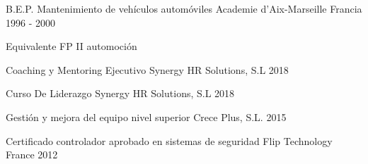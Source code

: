 
    \begin{cventries}

      \cventry
        {B.E.P. Mantenimiento de vehículos automóviles} %
        {Academie d’Aix-Marseille} %
        {Francia} %
        {1996 - 2000} %
        {
          \begin{cvitems} %
            \item {Equivalente FP II automoción}
          \end{cvitems}
        }
    
    \end{cventries}


    \begin{cvhonors}


      \cvhonor
        {Coaching y Mentoring Ejecutivo}
        {Synergy HR Solutions, S.L}
        {}
        {2018}
      
      \cvhonor
        {Curso De Liderazgo}
        {Synergy HR Solutions, S.L}
        {}
        {2018}

      \cvhonor
        {Gestión y mejora del equipo nivel superior}
        {Crece Plus, S.L.}
        {}
        {2015}

      \cvhonor
        {Certificado controlador aprobado en sistemas de seguridad}
        {Flip Technology France}
        {}
        {2012}
    
    \end{cvhonors}
